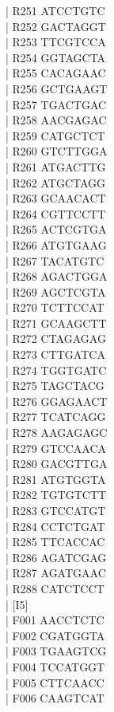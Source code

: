\documentclass[titlepage,10pt,a4paper,uplatex]{jsbook}
\newenvironment{content}{\begin{shaded}\vspace{-1em}\raggedright\ttfamily\footnotesize\setlength{\baselineskip}{1.4em}}{\end{shaded}\vspace{-1em}}
\begin{document}
\begin{content}
| R251	ATCCTGTC\\
| R252	GACTAGGT\\
| R253	TTCGTCCA\\
| R254	GGTAGCTA\\
| R255	CACAGAAC\\
| R256	GCTGAAGT\\
| R257	TGACTGAC\\
| R258	AACGAGAC\\
| R259	CATGCTCT\\
| R260	GTCTTGGA\\
| R261	ATGACTTG\\
| R262	ATGCTAGG\\
| R263	GCAACACT\\
| R264	CGTTCCTT\\
| R265	ACTCGTGA\\
| R266	ATGTGAAG\\
| R267	TACATGTC\\
| R268	AGACTGGA\\
| R269	AGCTCGTA\\
| R270	TCTTCCAT\\
| R271	GCAAGCTT\\
| R272	CTAGAGAG\\
| R273	CTTGATCA\\
| R274	TGGTGATC\\
| R275	TAGCTACG\\
| R276	GGAGAACT\\
| R277	TCATCAGG\\
| R278	AAGAGAGC\\
| R279	GTCCAACA\\
| R280	GACGTTGA\\
| R281	ATGTGGTA\\
| R282	TGTGTCTT\\
| R283	GTCCATGT\\
| R284	CCTCTGAT\\
| R285	TTCACCAC\\
| R286	AGATCGAG\\
| R287	AGATGAAC\\
| R288	CATCTCCT\\
| [I5]\\
| F001	AACCTCTC\\
| F002	CGATGGTA\\
| F003	TGAAGTCG\\
| F004	TCCATGGT\\
| F005	CTTCAACC\\
| F006	CAAGTCAT\\

\end{content}
\end{document}
